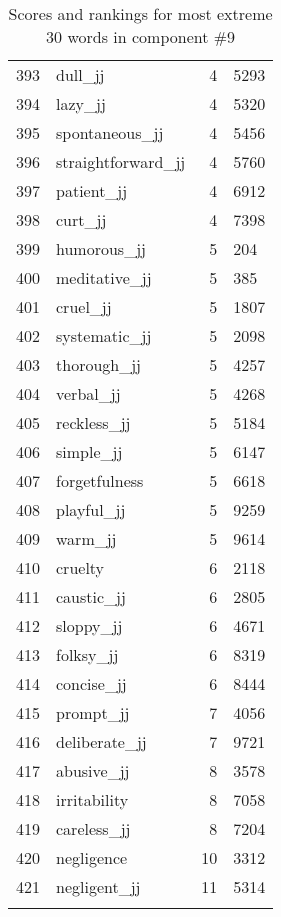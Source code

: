 \begin{longtable}[!htbp]{| rlr@{.}l |}
    393 & dull\_jj & 4 & 5293 \\
    394 & lazy\_jj & 4 & 5320 \\
    395 & spontaneous\_jj & 4 & 5456 \\
    396 & straightforward\_jj & 4 & 5760 \\
    397 & patient\_jj & 4 & 6912 \\
    398 & curt\_jj & 4 & 7398 \\
    399 & humorous\_jj & 5 & 204 \\
    400 & meditative\_jj & 5 & 385 \\
    401 & cruel\_jj & 5 & 1807 \\
    402 & systematic\_jj & 5 & 2098 \\
    403 & thorough\_jj & 5 & 4257 \\
    404 & verbal\_jj & 5 & 4268 \\
    405 & reckless\_jj & 5 & 5184 \\
    406 & simple\_jj & 5 & 6147 \\
    407 & forgetfulness & 5 & 6618 \\
    408 & playful\_jj & 5 & 9259 \\
    409 & warm\_jj & 5 & 9614 \\
    410 & cruelty & 6 & 2118 \\
    411 & caustic\_jj & 6 & 2805 \\
    412 & sloppy\_jj & 6 & 4671 \\
    413 & folksy\_jj & 6 & 8319 \\
    414 & concise\_jj & 6 & 8444 \\
    415 & prompt\_jj & 7 & 4056 \\
    416 & deliberate\_jj & 7 & 9721 \\
    417 & abusive\_jj & 8 & 3578 \\
    418 & irritability & 8 & 7058 \\
    419 & careless\_jj & 8 & 7204 \\
    420 & negligence & 10 & 3312 \\
    421 & negligent\_jj & 11 & 5314 \\
    \hline
    \caption{Scores and rankings for most extreme 30 words in component \#9} \\
\end{longtable}
